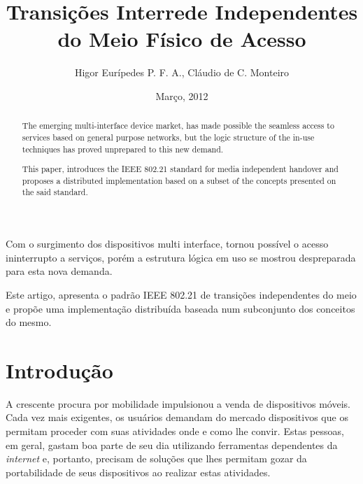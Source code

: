 \documentclass[12pt]{article}
\title{Transições Interrede Independentes do Meio Físico de Acesso}
\author{Higor Eurípedes P. F. A.\inst{1}, Cláudio de C. Monteiro\inst{1}}
\date{Março, 2012}
\begin{document}
\maketitle

\begin{resumo}

Com o surgimento dos dispositivos multi interface, tornou possível o acesso 
ininterrupto a serviços, porém a estrutura lógica em uso se mostrou 
despreparada para esta nova demanda.

Este artigo, apresenta o padrão IEEE 802.21 de transições independentes do 
meio e propõe uma implementação distribuída baseada num subconjunto dos 
conceitos do mesmo.

\end{resumo}

\begin{abstract}

The emerging multi-interface device market, has made possible the seamless 
access to services based on general purpose networks, but the logic structure 
of the in-use techniques has proved unprepared to this new demand.

This paper, introduces the IEEE 802.21 standard for media independent handover 
and proposes a distributed implementation based on a subset of the concepts 
presented on the said standard.

\end{abstract}


\section{Introdução} \label{sec:introducao} %

A crescente procura por mobilidade impulsionou a venda de dispositivos móveis.  
Cada vez mais exigentes, os usuários demandam do mercado dispositivos que os 
permitam proceder com suas atividades onde e como lhe convir. Estas pessoas, 
em geral, gastam boa parte de seu dia utilizando ferramentas dependentes da 
\textit{internet} e, portanto, precisam de soluções que lhes permitam gozar da 
portabilidade de seus dispositivos ao realizar estas atividades.
\end{document}
